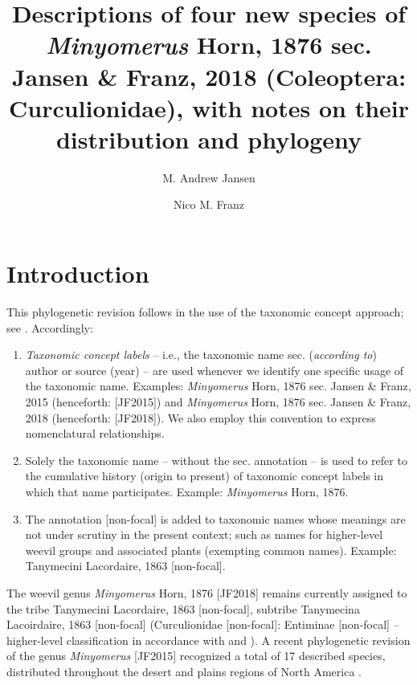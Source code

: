 \documentclass[fleqn,10pt,lineno]{wlpeerj} %
\title{Descriptions of four new species of \textit{Minyomerus} Horn, 1876 sec. Jansen \& Franz, 2018 (Coleoptera: Curculionidae), with notes on their distribution and phylogeny}
\author[1]{M. Andrew Jansen}
\author[2]{Nico M. Franz}
\affil[1]{School of Life Sciences, 427 E Tyler Mall, PO Box 874501, Tempe, AZ 85287}
\affil[2]{ASU Natural History Collections, 734 W Alameda Dr, Tempe, AZ 85282}
\begin{document}
\flushbottom
\maketitle
\thispagestyle{empty}

\section*{Introduction}\label{sec:intro}
	This phylogenetic revision follows \citet{jansen2015} in the use of the taxonomic concept approach; see \citet{fp2009, fea2016a, fea2016b}. 
	Accordingly:
	
	\begin{enumerate}[itemsep=-0.4em]
		\item \textit{Taxonomic concept labels} -- i.e., the taxonomic name sec. (\textit{according to}) author or source (year) -- are used whenever we identify one specific usage of the taxonomic name.
		Examples: \textit{Minyomerus} Horn, 1876 sec. Jansen \& Franz, 2015 (henceforth: [JF2015]) and \textit{Minyomerus} Horn, 1876 sec. Jansen \& Franz, 2018 (henceforth: [JF2018]). 
		We also employ this convention to express nomenclatural relationships. 
		\item Solely the taxonomic name -- without the sec. annotation -- is used to refer to the cumulative history (origin to present) of taxonomic concept labels in which that name participates. 
		Example: \textit{Minyomerus} Horn, 1876.
		\item The annotation [non-focal] is added to taxonomic names whose meanings are not under scrutiny in the present context; such as names for higher-level weevil groups and associated plants (exempting common names).
		Example: Tanymecini Lacordaire, 1863 [non-focal].
	\end{enumerate}
	
	The weevil genus \textit{Minyomerus} Horn, 1876 [JF2018] remains currently assigned to the tribe Tanymecini Lacordaire, 1863 [non-focal], subtribe Tanymecina Lacoirdaire, 1863 [non-focal] (Curculionidae [non-focal]: Entiminae [non-focal] -- higher-level classification in accordance with \citealt{alonso1999} and \citealt{bouchard2011}). 
	A recent phylogenetic revision of the genus \textit{Minyomerus} [JF2015] recognized a total of 17 described species, distributed throughout the desert and plains regions of North America \citep{jansen2015}.
	
\end{document}
